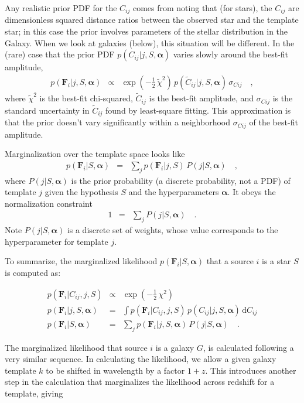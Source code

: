 \documentclass[12pt,preprint]{aastex}
\newcommand{\datavector}[1]{\boldsymbol{#1}}
\newcommand{\flux}{\datavector{F}}
\newcommand{\hyperpars}{\datavector{\alpha}}
\newcommand{\dd}{\mathrm{d}}
\begin{document}
Any realistic prior PDF for the $C_{ij}$ comes from noting that (for
stars), the $C_{ij}$ are dimensionless squared distance ratios between
the observed star and the template star; in this case the prior
involves parameters of the stellar distribution in the Galaxy.  When
we look at galaxies (below), this situation will be different.  In the
(rare) case that the prior PDF $p(C_{ij}|j,S,\hyperpars)$ varies
slowly around the best-fit amplitude,
\begin{eqnarray}\displaystyle
p(\flux_i|j,S,\hyperpars) & \propto & \exp(-\frac{1}{2}\,\tilde{\chi}^2)
  \,p(\tilde{C}_{ij}|j,S,\hyperpars)\,\sigma_{Cij}
\quad ,
\end{eqnarray}
where $\tilde{\chi}^2$ is the best-fit chi-squared, $\tilde{C}_{ij}$
is the best-fit amplitude, and $\sigma_{Cij}$ is the standard
uncertainty in $\tilde{C}_{ij}$ found by least-square fitting.  This
approximation is that the prior doesn't vary significantly
within a neighborhood $\sigma_{Cij}$ of the best-fit amplitude.  

Marginalization over the template space looks like
\begin{eqnarray}\displaystyle
p(\flux_i|S,\hyperpars) & = & \sum_j p(\flux_i|j,S)\,P(j|S,\hyperpars)
\quad ,
\end{eqnarray}
where $P(j|S,\hyperpars)$ is the prior probability (a discrete
probability, not a PDF) of template $j$ given the hypothesis $S$ and
the hyperparameters $\hyperpars$.  It obeys the normalization
constraint
\begin{eqnarray}\displaystyle
1 & = & \sum_j P(j|S,\hyperpars)
\quad .
\end{eqnarray}
\noindent Note $P(j|S,\hyperpars)$ is a discrete set of weights, 
whose value corresponds to the hyperparameter for template $j$.

To summarize, the marginalized likelihood $p(\flux_i|S,\hyperpars)$ that 
a source $i$ is a star $S$ is computed as:

\begin{eqnarray}\displaystyle
\label{eqn:starmarg} 
p(\flux_i|C_{ij},j,S) & \propto & \exp(-\frac{1}{2}\,\chi^2)
\nonumber\\
p(\flux_i|j,S,\hyperpars) & = & \int p(\flux_i|C_{ij},j,S)\,p(C_{ij}|j,S,\hyperpars)\,\dd C_{ij}
\nonumber\\
p(\flux_i|S,\hyperpars) & = & \sum_j p(\flux_i|j,S,\hyperpars)\,P(j|S,\hyperpars)
\quad .
\end{eqnarray}


The marginalized likelihood that source $i$ is a galaxy $G$, is calculated 
following a very similar sequence.  In calculating the likelihood, we 
allow a given galaxy template $k$ to be shifted in wavelength by 
a factor $1+z$.  This introduces another step in the calculation that 
marginalizes the likelihood across redshift for a template, giving 
\end{document}
